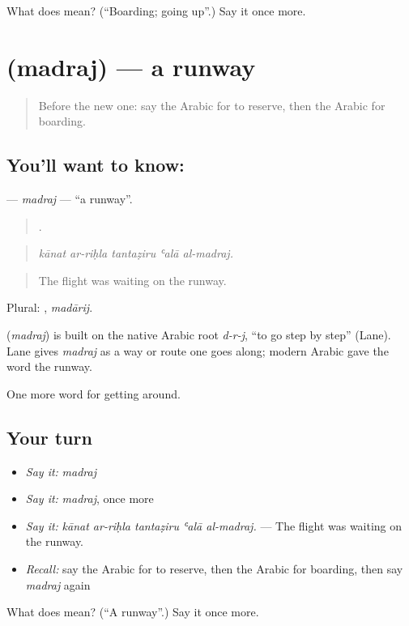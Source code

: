 \begin{tcolorbox}[breakable,colback=teal!4,colframe=teal!35!black,title={Before you move on}]
What does  mean? (\textquotedblleft{}Boarding; going up\textquotedblright{}.) Say it once more.
\end{tcolorbox}
\section[\texorpdfstring{\ar{مدرج} (madraj)}{مدرج (madraj)}]{ (madraj) — a runway}

\label{lesson:AR-C423-madraj}



\begin{quote}
Before the new one: say the Arabic for to reserve, then the Arabic for boarding.
\end{quote}

\subsection*{You'll want to know: }
\textbf{} — \emph{madraj} — \textquotedblleft{}a runway\textquotedblright{}.

\begin{quote}
    .
\end{quote}

\begin{quote}
\emph{kānat ar-riḥla tantaẓiru ʿalā al-madraj.}
\end{quote}

\begin{quote}
The flight was waiting on the runway.
\end{quote}

Plural: , \emph{madārij}.

\begin{cousinweb}
\textbf{} (\emph{madraj}) is built on the native Arabic root \emph{d-r-j}, \textquotedblleft{}to go step by step\textquotedblright{} (Lane). Lane gives \emph{madraj} as a way or route one goes along; modern Arabic gave the word the runway.
\end{cousinweb}

\begin{grammarlens}[title={What you've built}]
One more word for getting around.
\end{grammarlens}

\subsection*{Your turn}
\begin{itemize}
\raggedright
  \item \emph{Say it:} \emph{madraj}
  \item \emph{Say it:} \emph{madraj}, once more
  \item \emph{Say it:} \emph{kānat ar-riḥla tantaẓiru ʿalā al-madraj.} — The flight was waiting on the runway.
  \item \emph{Recall:} say the Arabic for to reserve, then the Arabic for boarding, then say \emph{madraj} again
\end{itemize}

\begin{tcolorbox}[breakable,colback=teal!4,colframe=teal!35!black,title={Before you move on}]
What does  mean? (\textquotedblleft{}A runway\textquotedblright{}.) Say it once more.
\end{tcolorbox}
